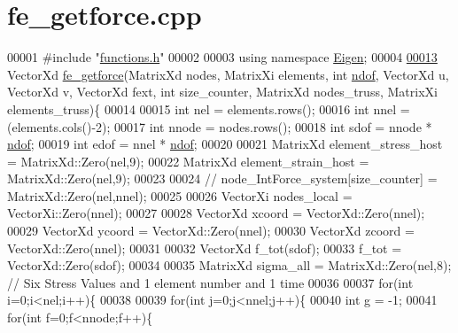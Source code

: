 \hypertarget{fe__getforce_8cpp_source}{}\section{fe\+\_\+getforce.\+cpp}
\label{fe__getforce_8cpp_source}

\begin{DoxyCode}
00001 \textcolor{preprocessor}{#include "\hyperlink{functions_8h}{functions.h}"}
00002 
00003 \textcolor{keyword}{using namespace }\hyperlink{namespace_eigen}{Eigen};
00004 
\hyperlink{fe__getforce_8cpp_a6696827a8591495e5ea710b112fad5ef}{00013} VectorXd \hyperlink{fe__getforce_8cpp_a6696827a8591495e5ea710b112fad5ef}{fe\_getforce}(MatrixXd nodes, MatrixXi elements, \textcolor{keywordtype}{int} \hyperlink{_global_variables_8h_aa789fe4d8a13fd0990b630909430d5d0}{ndof}, VectorXd u, VectorXd v, 
      VectorXd fext, \textcolor{keywordtype}{int} size\_counter, MatrixXd nodes\_truss, MatrixXi elements\_truss)\{
00014 
00015     \textcolor{keywordtype}{int} nel = elements.rows();
00016     \textcolor{keywordtype}{int} nnel = (elements.cols()-2);
00017     \textcolor{keywordtype}{int} nnode = nodes.rows();
00018     \textcolor{keywordtype}{int} sdof = nnode * \hyperlink{_global_variables_8h_aa789fe4d8a13fd0990b630909430d5d0}{ndof};
00019     \textcolor{keywordtype}{int} edof = nnel * \hyperlink{_global_variables_8h_aa789fe4d8a13fd0990b630909430d5d0}{ndof};
00020 
00021     MatrixXd element\_stress\_host = MatrixXd::Zero(nel,9);
00022     MatrixXd element\_strain\_host = MatrixXd::Zero(nel,9);
00023 
00024     \textcolor{comment}{// node\_IntForce\_system[size\_counter] = MatrixXd::Zero(nel,nnel);}
00025 
00026     VectorXi nodes\_local = VectorXi::Zero(nnel);
00027 
00028     VectorXd xcoord = VectorXd::Zero(nnel);
00029     VectorXd ycoord = VectorXd::Zero(nnel);
00030     VectorXd zcoord = VectorXd::Zero(nnel);
00031 
00032     VectorXd f\_tot(sdof);
00033     f\_tot = VectorXd::Zero(sdof);
00034 
00035     MatrixXd sigma\_all = MatrixXd::Zero(nel,8); \textcolor{comment}{// Six Stress Values and 1 element number and 1 time}
00036 
00037     \textcolor{keywordflow}{for}(\textcolor{keywordtype}{int} i=0;i<nel;i++)\{
00038 
00039         \textcolor{keywordflow}{for}(\textcolor{keywordtype}{int} j=0;j<nnel;j++)\{
00040             \textcolor{keywordtype}{int} g = -1;
00041             \textcolor{keywordflow}{for}(\textcolor{keywordtype}{int} f=0;f<nnode;f++)\{

\end{DoxyCode}
